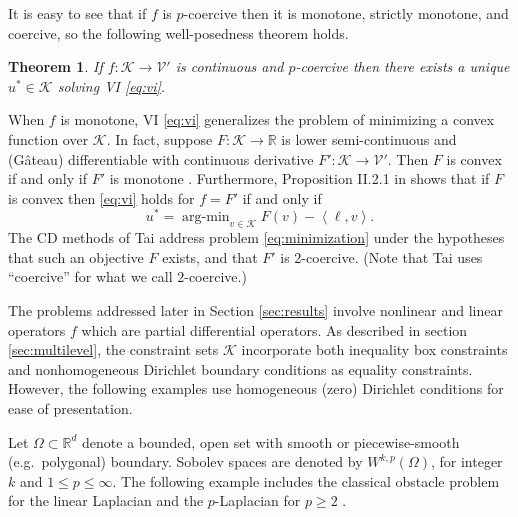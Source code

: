 \documentclass[letterpaper,final,12pt,reqno]{amsart}
\theoremstyle{cstyle}
\newtheorem{theorem}{Theorem}
\theoremstyle{cstyle*}
\theoremstyle{dstyle}
\numberwithin{equation}{section}
\numberwithin{figure}{section}
\numberwithin{table}{section}
\numberwithin{theorem}{section}
\newcommand{\RR}{\mathbb{R}}
\newcommand{\cK}{\mathcal{K}}
\newcommand{\cV}{\mathcal{V}}
\newcommand{\ip}[2]{\left<#1,#2\right>}
\begin{document}
It is easy to see that if $f$ is $p$-coercive then it is monotone, strictly monotone, and coercive, so the following well-posedness theorem holds.

\begin{theorem}  \label{thm:viwellposed}  If $f:\cK \to \cV'$ is continuous and $p$-coercive then there exists a unique $u^*\in \cK$ solving VI \eqref{eq:vi}.
\end{theorem}

When $f$ is monotone, VI \eqref{eq:vi} generalizes the problem of minimizing a convex function over $\cK$.  In fact, suppose $F:\cK \to \RR$ is lower semi-continuous and (G\^ateau) differentiable with continuous derivative $F':\cK \to \cV'$.  Then $F$ is convex if and only if $F'$ is monotone \cite[Proposition I.5.5]{EkelandTemam1976}.  Furthermore, Proposition II.2.1 in \cite{EkelandTemam1976} shows that if $F$ is convex then \eqref{eq:vi} holds for $f=F'$ if and only if
\begin{equation}
u^* = \operatorname{arg-min}_{v\in\cK} F(v) - \ip{\ell}{v}. \label{eq:minimization}
\end{equation}
The CD methods of Tai \cite{Tai2003} address problem \eqref{eq:minimization} under the hypotheses that such an objective $F$ exists, and that $F'$ is 2-coercive.  (Note that Tai \cite{Tai2003} uses ``coercive'' for what we call $2$-coercive.)

The problems addressed later in Section \ref{sec:results} involve nonlinear and linear operators $f$ which are partial differential operators.  As described in section \ref{sec:multilevel}, the constraint sets $\mathcal{K}$ incorporate both inequality box constraints and nonhomogeneous Dirichlet boundary conditions as equality constraints.  However, the following examples use homogeneous (zero) Dirichlet conditions for ease of presentation.

Let $\Omega \subset \RR^d$ denote a bounded, open set with smooth or piecewise-smooth (e.g.~polygonal) boundary.  Sobolev spaces \cite{Evans2010} are denoted by $W^{k,p}(\Omega)$, for integer $k$ and $1\le p \le \infty$.  The following example includes the classical obstacle problem for the linear Laplacian \cite{GraeserKornhuber2009} and the $p$-Laplacian for $p\ge 2$ \cite{ChoeLewis1991}.
\end{document}
